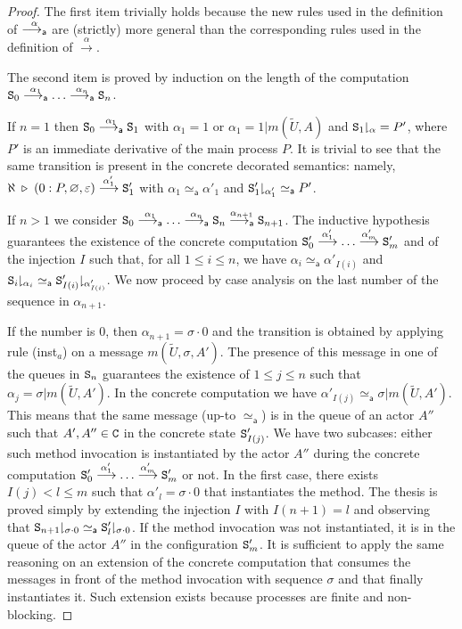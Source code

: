 \documentclass{LMCS}
\theoremstyle{plain}\newtheorem{proposition}[thm]{Proposition}
\theoremstyle{plain}\newtheorem{lemma}[thm]{Lemma}
\theoremstyle{plain}\newtheorem{theorem}[thm]{Theorem}
\theoremstyle{plain}\newtheorem{corollary}[thm]{Corollary}
\newcommand{\rulename}[1]{{\sc(#1)}}
\newcommand{\State}{{\tt S}}
\newcommand{\lred}[1]{\stackrel{#1}{\longrightarrow}}
\newcommand{\proj}[2]{{#1\!\!\downharpoonright_{#2}}}
\newcommand{\wt}[1]{\widetilde{#1}}
\newcommand{\adef}[1]{{\tt #1}}
\begin{document}
\begin{proof}
The first item trivially holds because the new
rules used in the definition of $\stackrel{\alpha}{\longrightarrow_{\mathsf a}}$
are (strictly) more general than the corresponding
rules used in the definition of $\lred{\alpha}$.

The second item is proved by induction on the length of the computation 
$\State_0 \absred{\alpha_1} \ldots 
\absred{\alpha_n} \State_n$.

If $n=1$ then $\State_0 \absred{\alpha_1} \State_1$
with $\alpha_1=1$ or $\alpha_1=1|m(\wt{U},A)$ 
and $\proj{\State_1}{\alpha}=P'$, where $P'$
is an immediate derivative of the main process $P$.
It is trivial to see that the same transition
is present in the concrete decorated semantics:
namely, $\aleph \; \triangleright \; (0:P, \varnothing, \varepsilon) \lred{\alpha'_1} \State'_1$ with 
$\alpha_1 \simeq_{\mathsf a} \alpha'_1$ and 
$\proj{\State'_1}{\alpha'_1} \simeq_{\mathsf a} P'$.

If $n>1$
we consider $\State_0 \absred{\alpha_1} \ldots 
\absred{\alpha_n} \State_n\absred{\alpha_{n+1}} \State_{n+1}$. 
The inductive hypothesis guarantees the existence of the concrete computation 
$\State'_0 \lred{\alpha'_1} \ldots \lred{\alpha'_m} \State'_m$ and of the injection $I$ 
such that, for all $1\leq i \leq n$, 
we have $\alpha_i \simeq_{\mathsf a} \alpha'_{I(i)}$ and 
$\proj{\State_i}{\alpha_i} \simeq_{\mathsf a} \proj{\State'_{I(i)}}{\alpha'_{I(i)}}$.
We now proceed by case analysis on the last number of the sequence
in $\alpha_{n+1}$.

If the number is 0, then $\alpha_{n+1}=\sigma\cdot 0$ and the transition is obtained
by applying rule \rulename{inst$_a$}
on a message $m(\wt{U},\sigma,A')$.
The presence of this message in one of the queues in $\State_n$
guarantees the existence of $1\leq j\leq n$
such that $\alpha_j=\sigma|m(\wt{U},A')$.
In the concrete computation we have $\alpha'_{I(j)}\simeq_{\mathsf a} \sigma|m(\wt{U},A')$.
This means that the same message (up-to $\simeq_{\mathsf a}$) is in the 
queue of an actor $A''$ such that $A',A'' \in {\adef{C}}$ in the concrete state $\State'_{I(j)}$.
We have two subcases: either such method invocation
is instantiated by the actor $A''$ during the concrete
computation $\State'_0 \lred{\alpha'_1} \ldots \lred{\alpha'_m} \State'_m$
or not. In the first case, there exists $I(j) < l \leq m$ such that 
$\alpha'_l=\sigma\cdot 0$ that instantiates
the method. The thesis is proved simply by extending the injection
$I$ with $I(n+1)=l$ and observing that $\proj{\State_{n+1}}{\sigma\cdot 0}  \simeq_{\mathsf a} \proj{\State'_l}{\sigma\cdot 0}$.
If the method invocation was not instantiated, it is in the
queue of the actor $A''$ in the configuration $\State'_m$. It is sufficient
to apply the same reasoning on an extension of the concrete computation
that consumes the messages in front of the method invocation with sequence $\sigma$
and that finally instantiates it.
Such extension exists because processes are finite and non-blocking.


\end{proof}
\end{document}

